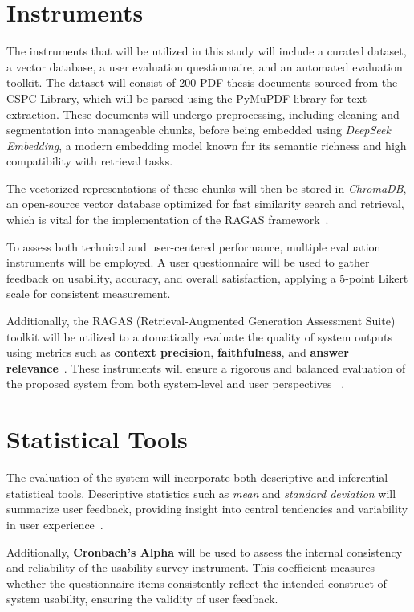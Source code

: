 \begin{refsection}
\section{Instruments}

The instruments that will be utilized in this study will include a curated dataset, a vector database, a user evaluation questionnaire, and an automated evaluation toolkit. The dataset will consist of 200 PDF thesis documents sourced from the CSPC Library, which will be parsed using the PyMuPDF library for text extraction. These documents will undergo preprocessing, including cleaning and segmentation into manageable chunks, before being embedded using \textit{DeepSeek Embedding}, a modern embedding model known for its semantic richness and high compatibility with retrieval tasks.

The vectorized representations of these chunks will then be stored in \textit{ChromaDB}, an open-source vector database optimized for fast similarity search and retrieval, which is vital for the implementation of the RAGAS framework~\cite{trychroma2023chroma}.

To assess both technical and user-centered performance, multiple evaluation instruments will be employed. A user questionnaire will be used to gather feedback on usability, accuracy, and overall satisfaction, applying a 5-point Likert scale for consistent measurement.

Additionally, the RAGAS (Retrieval-Augmented Generation Assessment Suite) toolkit will be utilized to automatically evaluate the quality of system outputs using metrics such as \textbf{context precision}, \textbf{faithfulness}, and \textbf{answer relevance}~\cite{shinn2023ragas}. These instruments will ensure a rigorous and balanced evaluation of the proposed system from both system-level and user perspectives~ \cite{lin2021bert}.

\section{Statistical Tools}

The evaluation of the system will incorporate both descriptive and inferential statistical tools. Descriptive statistics such as \textit{mean} and \textit{standard deviation} will summarize user feedback, providing insight into central tendencies and variability in user experience~\cite{holmes2023chatbot}.

Additionally, \textbf{Cronbach’s Alpha} will be used to assess the internal consistency and reliability of the usability survey instrument. This coefficient measures whether the questionnaire items consistently reflect the intended construct of system usability, ensuring the validity of user feedback.


\end{refsection}
